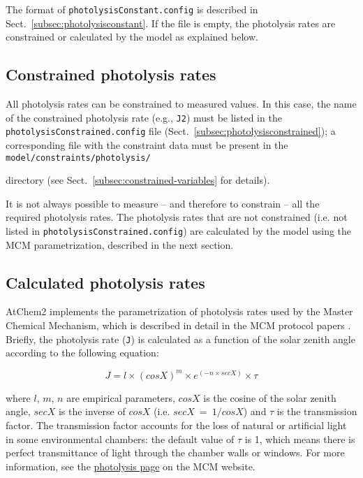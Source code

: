 The format of \texttt{photolysisConstant.config} is described in
Sect.~\ref{subsec:photolysisconstant}. If the file is empty, the
photolysis rates are constrained or calculated by the model as
explained below.

\subsection{Constrained photolysis rates} \label{subsec:constrained-photolysis-rates}

All photolysis rates can be constrained to measured values. In this
case, the name of the constrained photolysis rate (e.g., \texttt{J2})
must be listed in the \texttt{photolysisConstrained.config} file
(Sect.~\ref{subsec:photolysisconstrained}); a corresponding file with the
constraint data must be present in the \texttt{model/constraints/photolysis/}

directory (see Sect.~\ref{subsec:constrained-variables} for details).

It is not always possible to measure -- and therefore to constrain --
all the required photolysis rates. The photolysis rates that are not
constrained (i.e. not listed in \texttt{photolysisConstrained.config})
are calculated by the model using the MCM parametrization, described
in the next section.

\subsection{Calculated photolysis rates} \label{subsec:calculated-photolysis-rates}

AtChem2 implements the parametrization of photolysis rates used by the
Master Chemical Mechanism, which is described in detail in the MCM
protocol papers \citep{jenkin_1997, saunders_2003}. Briefly, the
photolysis rate (\texttt{J}) is calculated as a function of the solar
zenith angle according to the following equation:

\begin{equation}
  J = l \times (cosX)^m \times e^{(-n \times secX)} \times \tau
\end{equation}

where $l$, $m$, $n$ are empirical parameters, $cosX$ is the cosine of
the solar zenith angle, $secX$ is the inverse of $cosX$ (i.e.
$secX\ =\ 1/cosX$) and $\tau$ is the transmission factor. The
transmission factor accounts for the loss of natural or artificial
light in some environmental chambers: the default value of $\tau$ is
1, which means there is perfect transmittance of light through the
chamber walls or windows. For more information, see the
\href{https://mcm.york.ac.uk/MCM/rates/photolysis}{photolysis page}
on the MCM website.

